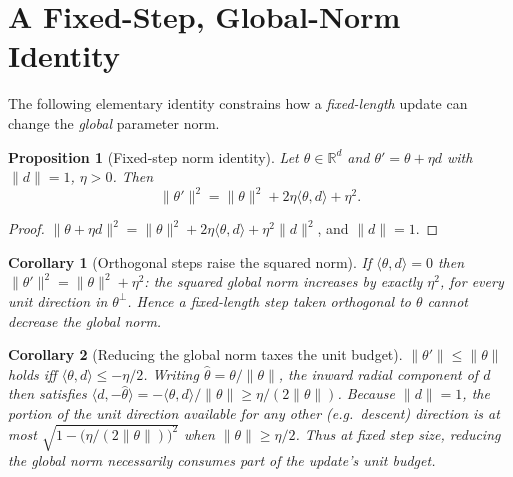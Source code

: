 \documentclass[conference]{IEEEtran}
\newtheorem{proposition}{Proposition}
\newtheorem{corollary}{Corollary}
\begin{document}
\section{A Fixed-Step, Global-Norm Identity}\label{sec:theory}
The following elementary identity constrains how a \emph{fixed-length} update can
change the \emph{global} parameter norm.

\begin{proposition}[Fixed-step norm identity]\label{prop:floor}
Let $\theta\in\mathbb{R}^{d}$ and $\theta'=\theta+\eta d$ with $\lVert d\rVert=1$,
$\eta>0$. Then
\begin{equation}
\lVert\theta'\rVert^{2}=\lVert\theta\rVert^{2}+2\eta\langle\theta,d\rangle+\eta^{2}.
\label{eq:law}
\end{equation}
\end{proposition}
\begin{proof}
$\lVert\theta+\eta d\rVert^{2}
=\lVert\theta\rVert^{2}+2\eta\langle\theta,d\rangle+\eta^{2}\lVert d\rVert^{2}$,
and $\lVert d\rVert=1$.
\end{proof}

\begin{corollary}[Orthogonal steps raise the squared norm]\label{cor:orth}
If $\langle\theta,d\rangle=0$ then
$\lVert\theta'\rVert^{2}=\lVert\theta\rVert^{2}+\eta^{2}$: the \emph{squared}
global norm increases by exactly $\eta^{2}$, for every unit direction in
$\theta^{\perp}$. Hence a fixed-length step taken orthogonal to $\theta$ cannot
decrease the global norm.
\end{corollary}

\begin{corollary}[Reducing the global norm taxes the unit budget]\label{cor:inward}
$\lVert\theta'\rVert\le\lVert\theta\rVert$ holds iff
$\langle\theta,d\rangle\le-\eta/2$. Writing $\hat\theta=\theta/\lVert\theta\rVert$,
the inward radial component of $d$ then satisfies
$\langle d,-\hat\theta\rangle=-\langle\theta,d\rangle/\lVert\theta\rVert
\ge \eta/(2\lVert\theta\rVert)$. Because $\lVert d\rVert=1$, the portion of the
unit direction available for any other (e.g.\ descent) direction is at most
$\sqrt{1-\big(\eta/(2\lVert\theta\rVert)\big)^{2}}$ when
$\lVert\theta\rVert\ge\eta/2$. Thus at fixed step size, reducing the global norm
necessarily consumes part of the update's unit budget.
\end{corollary}
\end{document}

